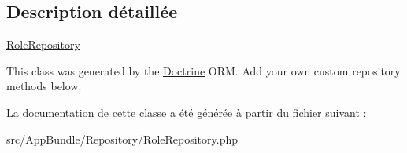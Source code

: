 \subsection{Description détaillée}
\hyperlink{classAppBundle_1_1Repository_1_1RoleRepository}{Role\+Repository}

This class was generated by the \hyperlink{namespaceAppBundle_1_1Doctrine}{Doctrine} O\+RM. Add your own custom repository methods below. 

La documentation de cette classe a été générée à partir du fichier suivant \+:\begin{DoxyCompactItemize}
\item 
src/\+App\+Bundle/\+Repository/Role\+Repository.\+php\end{DoxyCompactItemize}
